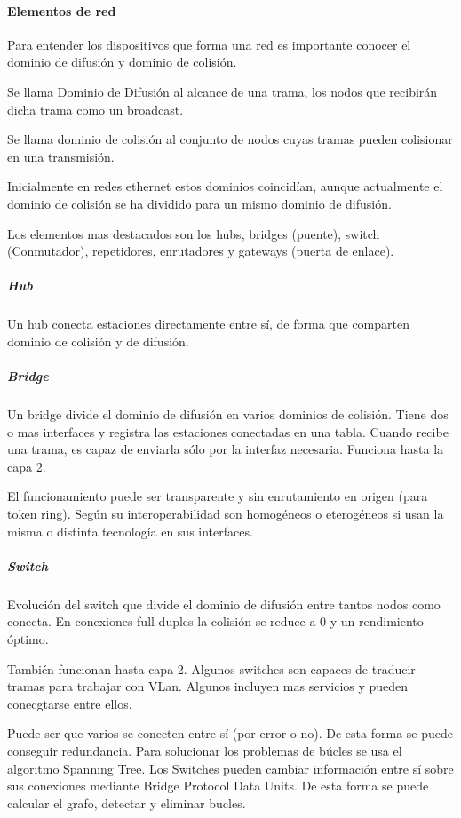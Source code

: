         \paragraph{Elementos de red} %
            Para entender los dispositivos que forma una red es importante conocer el dominio de difusión y dominio de colisión.

            Se llama Dominio de Difusión al alcance de una trama, los nodos que recibirán dicha trama como un broadcast.

            Se llama dominio de colisión al conjunto de nodos cuyas tramas pueden colisionar en una transmisión.

            Inicialmente en redes ethernet estos dominios coincidían, aunque actualmente el dominio de colisión se ha dividido para un mismo dominio de difusión.

            Los elementos mas destacados son los hubs, bridges (puente), switch (Conmutador), repetidores, enrutadores y gateways (puerta de enlace).

            \subparagraph{Hub} %
                Un hub conecta estaciones directamente entre sí, de forma que comparten dominio de colisión y de difusión.

            \subparagraph{Bridge} %
                Un bridge divide el dominio de difusión en varios dominios de colisión. Tiene dos o mas interfaces y registra las estaciones conectadas en una tabla. Cuando recibe una trama, es capaz de enviarla sólo por la interfaz necesaria. Funciona hasta la capa 2.

                El funcionamiento puede ser transparente y sin enrutamiento en origen (para token ring). Según su interoperabilidad son homogéneos o eterogéneos si usan la misma o distinta tecnología en sus interfaces.

            \subparagraph{Switch}  %
                Evolución del switch que divide el dominio de difusión entre tantos nodos como conecta. En conexiones full duples la colisión se reduce a 0 y un rendimiento óptimo.

                También funcionan hasta capa 2. Algunos switches son capaces de traducir tramas para trabajar con VLan. Algunos incluyen mas servicios y pueden conecgtarse entre ellos.

                Puede ser que varios se conecten entre sí (por error o no). De esta forma se puede conseguir redundancia. Para solucionar los problemas de búcles se usa el algoritmo Spanning Tree. Los Switches pueden cambiar información entre sí sobre sus conexiones mediante Bridge Protocol Data Units. De esta forma se puede calcular el grafo, detectar y eliminar bucles.

